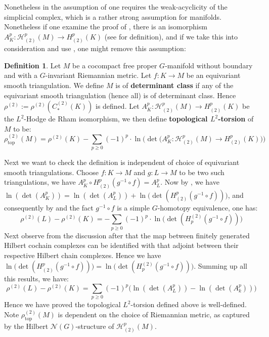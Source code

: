 \documentclass[11pt]{report}
\theoremstyle{definition}
\newtheorem{Def}{Definition}[chapter]
\theoremstyle{plain}
\newcommand{\vna}{\mathcal{N}}
\begin{document}
\par Nonetheless in the assumption of  one requires the weak-acyclicity of the simplicial complex, which is a rather strong assumption for manifolds. Nonetheless if one examine the proof of , there is an isomorphism $A_K^p:\mathcal{H}^p_{(2)}(M)\to H^p_{(2)}(K)$ (see \cite[Lemma~1.76ff]{luck2013} for definition), and if we take this into consideration and use , one might remove this assumption:
\begin{Def}\label{3.120}
	Let $M$ be a cocompact free proper $G$-manifold without boundary and with a $G$-invariant Riemannian metric. Let $f:K\to M$ be an equivariant smooth triangulation. We define $M$ is of \textbf{determinant class} if any of the equivariant smooth triangulation (hence all) is of determinant class. Hence $\rho^{(2)}:=\rho^{(2)}(C_*^{(2)}(K))$ is defined. Let $A_K^p:\mathcal{H}^p_{(2)}(M)\to H^p_{(2)}(K)$ be the $L^2$-Hodge de Rham isomorphism, we then define \textbf{topological $L^2$-torsion} of $M$ to be:
	\begin{equation*}
	\rho^{(2)}_{\mathrm{top}}(M)=\rho^{(2)}(K)-\sum_{p \geq 0}(-1)^p\cdot \ln\Bigg(\det\big(A_K^p:\mathcal{H}^p_{(2)}(M)\to H^p_{(2)}(K)\big)\Bigg)
	\end{equation*}
\end{Def}
Next we want to check the definition is independent of choice of equivariant smooth triangulations. Choose $f:K\to M$ and $g:L\to M$ to be two such triangulations, we have $A_K^p\circ H^p_{(2)}(g^{-1}\circ f)=A_L^p$. Now by , we have $\ln(\det(A^p_K))=\ln(\det(A_L^p))+\ln\bigg(\det (H^p_{(2)}(g^{-1}\circ f))\bigg)$, and consequently by  and the fact $g^{-1}\circ f$ is a simple $G$-homotopy equivalence, one has:
\begin{equation*}
\rho^{(2)}(L)-\rho^{(2)}(K)=-\sum_{p \geq 0}(-1)^p\cdot \ln\Bigg(\det (H_p^{(2)}(g^{-1}\circ f))\Bigg)
\end{equation*}
Next observe from the discussion after  that the map between finitely generated Hilbert cochain complexes can be identified with that adjoint between their respective Hilbert chain complexes. Hence we have $\ln\bigg(\det (H^p_{(2)}(g^{-1}\circ f))\bigg)=\ln\bigg(\det (H_p^{(2)}(g^{-1}\circ f))\bigg)$. Summing up all this results, we have:
\begin{equation*}
\rho^{(2)}(L)-\rho^{(2)}(K)=\sum_{p \geq 0}(-1)^p\bigg(\ln(\det(A^p_L))-\ln(\det(A^p_k))\bigg)
\end{equation*}
Hence we have proved the topological $L^2$-torsion defined above is well-defined. Note $\rho^{(2)}_{\mathrm{top}}(M)$ is dependent on the choice of Riemannian metric, as captured by the Hilbert $\vna(G)$-structure of $\mathcal{H}^p_{(2)}(M)$.
\end{document}
